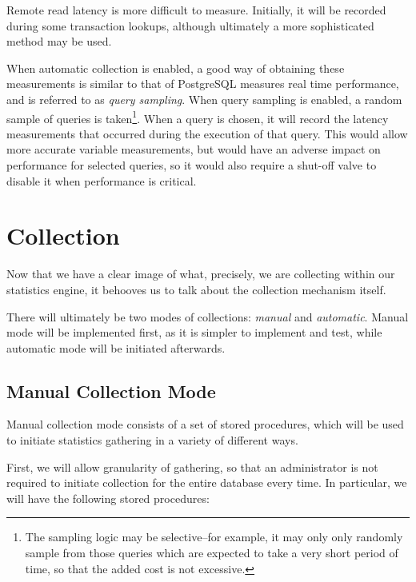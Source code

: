 Remote read latency is more difficult to measure. Initially, it will be recorded during some transaction lookups, although ultimately a more sophisticated method may be used.

When automatic collection is enabled, a good way of obtaining these measurements is similar to that of PostgreSQL\cite{PGCollector} measures real time performance, and is referred to as \emph{query sampling}. When query sampling is enabled, a random sample of queries is taken\footnote{The sampling logic may be selective--for example, it may only only randomly sample from those queries which are expected to take a very short period of time, so that the added cost is not excessive.}. When a query is chosen, it will record the latency measurements that occurred during the execution of that query. This would allow more accurate variable measurements, but would have an adverse impact on performance for selected queries, so it would also require a shut-off valve to disable it when performance is critical.

\section{Collection}
\label{sec:Collection}
Now that we have a clear image of what, precisely, we are collecting within our statistics engine, it behooves us to talk about the collection mechanism itself.

There will ultimately be two modes of collections: \emph{manual} and \emph{automatic}. Manual mode will be implemented first, as it is simpler to implement and test, while automatic mode will be initiated afterwards.

\subsection{Manual Collection Mode}
Manual collection mode consists of a set of stored procedures, which will be used to initiate statistics gathering in a variety of different ways.

First, we will allow granularity of gathering, so that an administrator is not required to initiate collection for the entire database every time. In particular, we will have the following stored procedures:

